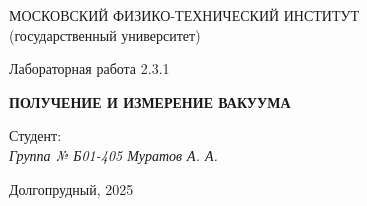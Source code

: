 \thispagestyle{empty}

\begin{center}
    МОСКОВСКИЙ ФИЗИКО-ТЕХНИЧЕСКИЙ ИНСТИТУТ \\
    (государственный университет)
\end{center}

\vfill

\begin{center}
    Лабораторная работа 2.3.1 \\ 
    \vspace{20pt}
    
    \textbf{ПОЛУЧЕНИЕ И ИЗМЕРЕНИЕ ВАКУУМА}
\end{center}  

\vfill

    \noindent Студент: \\
    \textit{Группа № Б01-405 \hfill Муратов А. А.}

\vfill

\begin{center}
    Долгопрудный, 2025
\end{center}